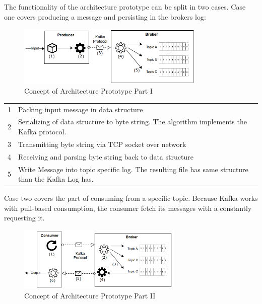 The functionality of the architecture prototype can be split in two cases.
Case one covers producing a message and persisting in the brokers log:
\begin{figure}[H]
    \centering
    \includegraphics[width=0.8\textwidth]{images/concept_producer.png}
    \caption{Concept of Architecture Prototype Part I}
    \label{fig:conept-producer}
\end{figure}

\begin{table}[h]
\begin{tabular}{ll}
1  & Packing input message in data structure                                                          \\
2  & Serializing of data structure to byte string. The algorithm implements the Kafka protocol.       \\
3 & Transmitting byte string via TCP socket over network                                             \\
4  & Receiving and parsing byte string back to data structure                                         \\
5   & Write Message into topic specific log. The resulting file has same structure than the Kafka Log has.
\end{tabular}
\end{table}

Case two covers the part of consuming from a specific topic. Because Kafka works with 
pull-based consumption, the consumer fetch its messages with a constantly requesting it. 

\begin{figure}[H]
    \centering
   \includegraphics[width=0.7\textwidth]{images/concept_consumer.png}
    \caption{Concept of Architecture Prototype Part II}
    \label{fig:concept-consumer}
\end{figure}

